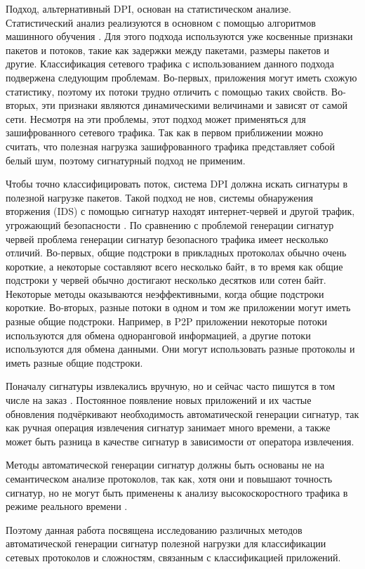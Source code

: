 Подход, альтернативный DPI, основан на статистическом анализе.
Статистический анализ реализуются в основном с помощью алгоритмов машинного обучения \cite{erman2006qrp05}.
Для этого подхода используются уже косвенные признаки пакетов и потоков, такие как задержки между пакетами, размеры пакетов и другие.
Классификация сетевого трафика с использованием данного подхода подвержена следующим проблемам.
Во-первых, приложения могут иметь схожую статистику, поэтому их потоки трудно отличить с помощью таких свойств.
Во-вторых, эти признаки являются динамическими величинами и зависят от самой сети.
Несмотря на эти проблемы, этот подход может применяться для зашифрованного сетевого трафика.
Так как в первом приближении можно считать, что полезная нагрузка зашифрованного трафика представляет собой белый шум,
поэтому сигнатурный подход не применим.

Чтобы точно классифицировать поток, система DPI должна искать сигнатуры в полезной нагрузке пакетов.
Такой подход не нов, системы обнаружения вторжения (IDS) с помощью сигнатур находят интернет-червей и другой трафик, угрожающий безопасности
\cite{singh2004automated, kim2004autograph, newsome2005polygraph}.
По сравнению с проблемой генерации сигнатур червей проблема генерации сигнатур безопасного трафика имеет несколько отличий.
Во-первых, общие подстроки в прикладных протоколах обычно очень короткие, а некоторые составляют всего несколько байт,
в то время как общие подстроки у червей обычно достигают несколько десятков или сотен байт.
Некоторые методы \cite{singh2004automated, kim2004autograph} оказываются неэффективными, когда общие подстроки короткие.
Во-вторых, разные потоки в одном и том же приложении могут иметь разные общие подстроки.
Например, в P2P приложении некоторые потоки используются для обмена одноранговой информацией,
а другие потоки используются для обмена данными. Они могут использовать разные протоколы и иметь разные общие подстроки.

Поначалу сигнатуры извлекались вручную, но и сейчас часто пишутся в том числе на заказ \cite{amonitoring}.
Постоянное появление новых приложений и их частые обновления подчёркивают необходимость автоматической генерации сигнатур,
так как ручная операция извлечения сигнатур занимает много времени, а также может быть разница в качестве сигнатур
в зависимости от оператора извлечения.

Методы автоматической генерации сигнатур должны быть основаны не на семантическом анализе протоколов, так как,
хотя они и повышают точность сигнатур, но не могут быть применены
к анализу высокоскоростного трафика в режиме реального времени \cite{park2008towards}.

Поэтому данная работа посвящена исследованию различных методов автоматической генерации сигнатур полезной нагрузки
для классификации сетевых протоколов и сложностям, связанным с классификацией приложений.

\newpage
